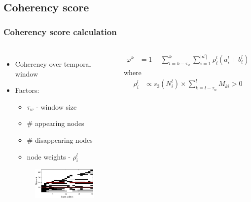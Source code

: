 \subsection{Coherency score}
\frame
{
	\frametitle{Coherency score calculation}
		
	\begin{columns}[T]
	\begin{itemize}
		\small
		\item Coherency over temporal window 
		\item Factors:
			\begin{itemize}
				\item $\tau_w$ - window size
				\item \# appearing nodes
				\item \# disappearing nodes
				\item node weights - $\rho^l_i$
			\end{itemize}
		\begin{figure}[p]
			\centering
			\hspace{-1cm}
			\includegraphics[width = 1\textwidth]{img/icsc/node_continuity.eps}
			\label{fig:coh_score_3}
		\end{figure}
	\end{itemize}
	\hspace{-2cm}
	\small
	\begin{align}
	\varphi^k &= 1 - \sum\limits_{l=k-\tau_w}^{k}\sum\limits_{i=1}^{\lvert n^l \rvert}\rho^{l}_i (a^{l}_i + b^{l}_i) \label{eq:incoherency_score}	\end{align}
	where
	\begin{align}
	\rho^l_i &\propto s_3(N^l_i) 
	\times \sum\limits_{k=l-{\tau_w}}^{l} M_{ki}>0 \label{eq:rho}									
	\end{align}

	\end{columns}
}

